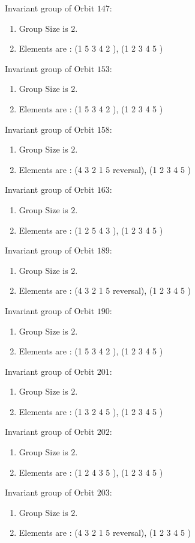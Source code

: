 \documentclass[12pt]{article}
\begin{document}
Invariant group of Orbit $147$:
\begin{enumerate}
\item Group Size is $2$.
\item Elements are : (1 5 3 4 2  ), (1 2 3 4 5  )
\end{enumerate}
Invariant group of Orbit $153$:
\begin{enumerate}
\item Group Size is $2$.
\item Elements are : (1 5 3 4 2  ), (1 2 3 4 5  )
\end{enumerate}
Invariant group of Orbit $158$:
\begin{enumerate}
\item Group Size is $2$.
\item Elements are : (4 3 2 1 5   reversal), (1 2 3 4 5  )
\end{enumerate}
Invariant group of Orbit $163$:
\begin{enumerate}
\item Group Size is $2$.
\item Elements are : (1 2 5 4 3  ), (1 2 3 4 5  )
\end{enumerate}
Invariant group of Orbit $189$:
\begin{enumerate}
\item Group Size is $2$.
\item Elements are : (4 3 2 1 5   reversal), (1 2 3 4 5  )
\end{enumerate}
Invariant group of Orbit $190$:
\begin{enumerate}
\item Group Size is $2$.
\item Elements are : (1 5 3 4 2  ), (1 2 3 4 5  )
\end{enumerate}
Invariant group of Orbit $201$:
\begin{enumerate}
\item Group Size is $2$.
\item Elements are : (1 3 2 4 5  ), (1 2 3 4 5  )
\end{enumerate}
Invariant group of Orbit $202$:
\begin{enumerate}
\item Group Size is $2$.
\item Elements are : (1 2 4 3 5  ), (1 2 3 4 5  )
\end{enumerate}
Invariant group of Orbit $203$:
\begin{enumerate}
\item Group Size is $2$.
\item Elements are : (4 3 2 1 5   reversal), (1 2 3 4 5  )
\end{enumerate}
\end{document}
